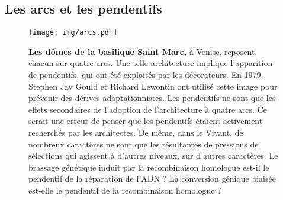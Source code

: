 \newpage

\subsection{Les arcs et les pendentifs}
\label{sub:arcs}
\begin{figure}[htbp]
  \centering
  \texttt{[image: img/arcs.pdf]}
  
  \caption*{ {\bf Les dômes de la basilique Saint Marc,} \rmfamily%
    à Venise, reposent chacun sur quatre arcs. Une telle architecture implique
    l'apparition de pendentifs, qui ont été exploités par les décorateurs. En
    1979, Stephen Jay Gould et Richard Lewontin ont utilisé cette image pour
    prévenir des dérives adaptationnistes\cite{gould_spandrels_1979}. Les
    pendentifs ne sont que les effets secondaires de l'adoption de
    l'architecture à quatre arcs. Ce serait une erreur de penser que les
    pendentifs étaient activement recherchés par les architectes. De même, dans
    le Vivant, de nombreux caractères ne sont que les résultantes de pressions
    de sélections qui agissent à d'autres niveaux, sur d'autres caractères. Le
    brassage génétique induit par la recombinaison homologue est-il le pendentif
    de la réparation de l'ADN \cite{fall_horizontal_2007}? La conversion génique
    biaisée est-elle le pendentif de la recombinaison homologue ? }
  \label{}
\end{figure}

